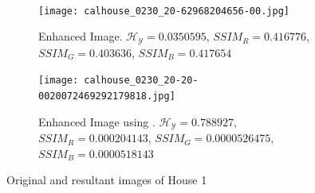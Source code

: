 \begin{figure}[H]
\begin{subfigure}[t]{0.45mm}
        \label{fig:casa1enhanced1}
    \end{subfigure}
    ~ %
    \begin{subfigure}[t]{width=45mm}
        \texttt{[image: calhouse\_0230\_20-62968204656-00.jpg]}
        \caption{Enhanced Image.  $\mathscr{H_Y}=0.0350595$, $SSIM_R=0.416776$, $SSIM_G=0.403636$, $SSIM_B=0.417654$}
        \label{fig:casa1enhanced2}
    \end{subfigure} 
    \begin{subfigure}[t]{width=0.45mm}
        \texttt{[image: calhouse\_0230\_20-20-0020072469292179818.jpg]}
        \caption{Enhanced Image using \cite{morepso}. $\mathscr{H_Y}=0.788927$, $SSIM_R=0.000204143$, $SSIM_G=0.0000526475$, $SSIM_B=0.0000518143$}
        \label{fig:casa1enhanced3}
    \end{subfigure}

    \caption{Original and resultant images of House 1}\label{fig:casa1}
\end{figure}


\begin{table}[H]
\setlength{\abovecaptionskip}{2pt plus 3pt minus 2pt} %
\caption[Parámetros de entrada para $MOPSO$]{Metric coefficients obtained using our approach for some non-dominated results from image in Figure (\ref{fig:casa1}), and the coefficients obtained using the approach of \cite{morepso}, shown in the last line.}
\begin{center}
\end{center}
\label{table:nodominadas}
\end{table}


